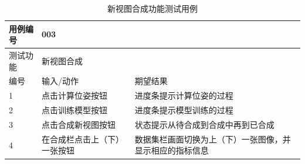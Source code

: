 \begin{table}[htbp]
	\centering
	\small{}\setlength{}
	\caption{新视图合成功能测试用例}
	\begin{tabular}{|p{2cm}<{\centering}|p{4cm}<{\centering}|p{4cm}<{\centering}|}
		\hline
		用例编号 & \multicolumn{2}{|l|}{003}       \\
		\hline
		测试功能 & \multicolumn{2}{|l|}{新视图合成}       \\
		\hline
		编号 & 输入/动作 & 期望结果 \\
		\hline
		1 & 点击计算位姿按钮 &  进度条提示计算位姿的过程 \\
		\hline
		2 & 点击训练模型按钮 &  进度条提示模型训练的过程 \\
		\hline
		3 & 点击合成新视图按钮 & 状态提示从待合成到合成中再到已合成 \\
		\hline
		4 & 在合成栏点击上（下）一张按钮 & 数据集栏画面切换为上（下）一张图像，并显示相应的指标信息 \\
		\hline
	\end{tabular}
	\label{tab:viewsynthesis}
\end{table}
